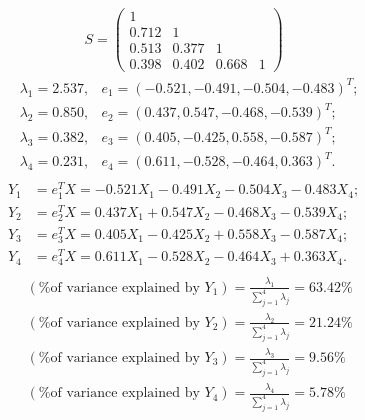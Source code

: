 \documentclass[12pt]{article}
\newenvironment{solution}[2][Solution]{\begin{trivlist}
\item[\hskip \labelsep {\bfseries #1}\hskip \labelsep {\bfseries #2.}]}{\end{trivlist}}
\newenvironment{question}[2][Question]{\begin{trivlist}
\item[\hskip \labelsep {\bfseries #1}\hskip \labelsep {\bfseries #2.}]}{\end{trivlist}}
\begin{document}
\newpage
\begin{question}{2}
\end{question}
\begin{solution}[Solution] \\ 
\begin{align*}
    S=\left(
    \begin{array}{cccc}
      1 &  &  &  \\
      0.712 & 1 &  &  \\
      0.513 & 0.377 & 1 & \\
      0.398 & 0.402 & 0.668 & 1
    \end{array} \right)
\end{align*}
\begin{align*}
    &\lambda_1 = 2.537, &e_1 =(-0.521,-0.491, -0.504,-0.483)^T;\\
    &\lambda_2 = 0.850, &e_2 =(0.437,0.547,-0.468,-0.539)^T;\\
    &\lambda_3 = 0.382, &e_3 =(0.405,-0.425,0.558,-0.587)^T;\\
    &\lambda_4 = 0.231, &e_4 =(0.611,-0.528,-0.464,0.363)^T.\\
\end{align*}
\begin{align*}
    Y_1 &=e_1^TX = -0.521X_1 -0.491X_2 -0.504X_3 -0.483X_4; \\
    Y_2 &=e_2^TX = 0.437X_1 +0.547X_2 -0.468X_3 -0.539X_4; \\
    Y_3 &=e_3^TX = 0.405X_1 -0.425X_2 +0.558X_3 -0.587X_4; \\
    Y_4 &=e_4^TX = 0.611X_1 -0.528X_2 -0.464X_3 +0.363X_4. \\
\end{align*}
\begin{align*}
    &(\text{\% of variance explained by $Y_1$})=\frac{\lambda_1}{\sum^4_{j=1}\lambda_j}=63.42\% \\
    &(\text{\% of variance explained by $Y_2$})=\frac{\lambda_2}{\sum^4_{j=1}\lambda_j}=21.24\% \\
    &(\text{\% of variance explained by $Y_3$})=\frac{\lambda_3}{\sum^4_{j=1}\lambda_j}=9.56\% \\
    &(\text{\% of variance explained by $Y_4$})=\frac{\lambda_4}{\sum^4_{j=1}\lambda_j}=5.78\% \\
\end{align*}


\end{solution}
\end{document}
